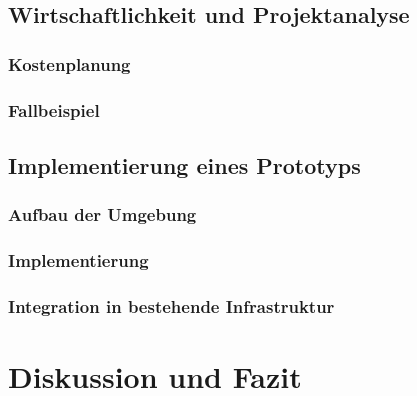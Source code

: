 \documentclass[a4paper, 12pt, oneside]{scrbook}
\begin{document}
	
	\section{Wirtschaftlichkeit und Projektanalyse}
	
		\subsection{Kostenplanung}
		
		\subsection{Fallbeispiel}
	
	\section{Implementierung eines Prototyps}
	
		\subsection{Aufbau der Umgebung}
		
		\subsection{Implementierung}
		
			
		
		\subsection{Integration in bestehende Infrastruktur}
			

	
	
	\chapter{Diskussion und Fazit}\label{ch:Diskussion_Fazit}
	
	
	
	
	\frontmatter
	\printbibliography
\end{document}
